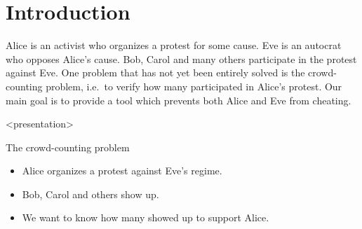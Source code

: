 \mode*

\section{Introduction}%
\label{Introduction}

Alice is an activist who organizes a protest for some cause.
Eve is an autocrat who opposes Alice's cause.
Bob, Carol and many others participate in the protest against Eve.
One problem that has not yet been entirely solved is the crowd-counting 
problem, i.e.\ to verify how many participated in Alice's protest.
Our main goal is to provide a tool which prevents both Alice and Eve from 
cheating.


\begin{frame}<presentation>
  \begin{block}{The crowd-counting problem}
    \begin{itemize}
      \item Alice organizes a protest against Eve's regime.
      \item Bob, Carol and others show up.
      \item We want to know how many showed up to support Alice.
    \end{itemize}
  \end{block}
\end{frame}


